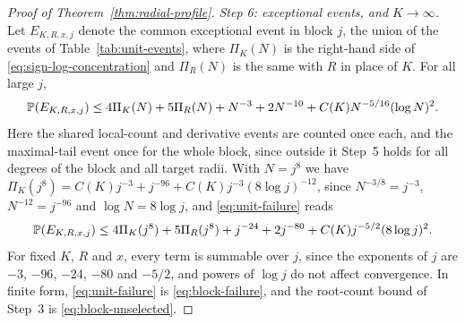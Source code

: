 \begin{proof}[Proof of Theorem~\ref{thm:radial-profile}]
\emph{Step 6: exceptional events, and $K\to\infty$.}
Let $E_{K,R,x,j}$ denote the common exceptional event in block $j$, the
union of the events of Table~\ref{tab:unit-events}, where $\Pi_K(N)$ is
the right-hand side of \eqref{eq:sign-log-concentration} and $\Pi_R(N)$
is the same with $R$ in place of $K$. For all large $j$,
\begin{equation}
 \mathbb P(E_{K,R,x,j})
 \le4\Pi_K(N)+5\Pi_R(N)+N^{-3}+2N^{-10}+C(K)N^{-5/16}(\log N)^2.
                                                        \label{eq:unit-failure}
\end{equation}
Here the shared local-count and derivative events are counted once each,
and the maximal-tail event once for the whole block, since outside it
Step~5 holds for all degrees of the block and all target radii.
With $N=j^8$ we have
$\Pi_K(j^8)=C(K)j^{-3}+j^{-96}+C(K)j^{-3}(8\log j)^{-12}$, since
$N^{-3/8}=j^{-3}$, $N^{-12}=j^{-96}$ and $\log N=8\log j$, and
\eqref{eq:unit-failure} reads
\[
 \mathbb P(E_{K,R,x,j})
 \le4\Pi_K(j^8)+5\Pi_R(j^8)+j^{-24}+2j^{-80}+C(K)j^{-5/2}(8\log j)^2.
\]
For fixed $K$, $R$ and $x$, every term is summable over $j$, since the
exponents of $j$ are $-3$, $-96$, $-24$, $-80$ and $-5/2$, and powers of
$\log j$ do not affect convergence.
In finite form, \eqref{eq:unit-failure} is \eqref{eq:block-failure}, and
the root-count bound of Step~3 is \eqref{eq:block-unselected}.


\end{proof}
